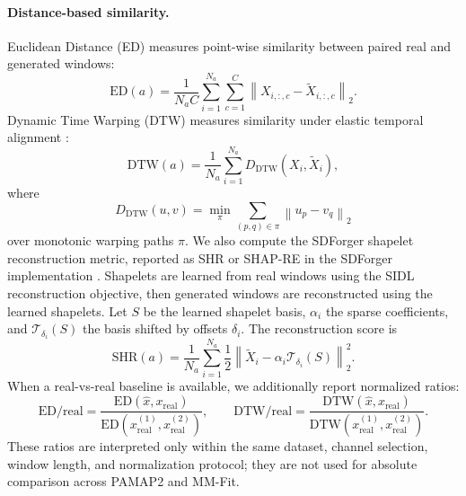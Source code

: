 \paragraph{Distance-based similarity.}
Euclidean Distance (ED) measures point-wise similarity between paired real and
generated windows:
\begin{equation}
    \mathrm{ED}(a)
    =
    \frac{1}{N_a C}
    \sum_{i=1}^{N_a}\sum_{c=1}^{C}
    \left\|
    X_{i,:,c}-\tilde{X}_{i,:,c}
    \right\|_2 .
\end{equation}
Dynamic Time Warping (DTW) measures similarity under elastic temporal alignment
\cite{sakoe1978dtw}:
\begin{equation}
    \mathrm{DTW}(a)
    =
    \frac{1}{N_a}
    \sum_{i=1}^{N_a}
    D_{\mathrm{DTW}}\!\left(X_i,\tilde{X}_i\right),
\end{equation}
where
\begin{equation}
    D_{\mathrm{DTW}}(u,v)
    =
    \min_{\pi}
    \sum_{(p,q)\in\pi}
    \left\|
    u_p-v_q
    \right\|_2
\end{equation}
over monotonic warping paths $\pi$. We also compute the SDForger shapelet
reconstruction metric, reported as SHR or SHAP-RE in the SDForger
implementation \cite{rousseau2025sdforger}. Shapelets are learned from real
windows using the SIDL reconstruction objective, then generated windows are
reconstructed using the learned shapelets. Let $S$ be the learned shapelet basis,
$\alpha_i$ the sparse coefficients, and $\mathcal{T}_{\delta_i}(S)$ the basis
shifted by offsets $\delta_i$. The reconstruction score is
\begin{equation}
    \mathrm{SHR}(a)
    =
    \frac{1}{N_a}
    \sum_{i=1}^{N_a}
    \frac{1}{2}
    \left\|
    \tilde{X}_i
    -
    \alpha_i\mathcal{T}_{\delta_i}(S)
    \right\|_2^2 .
\end{equation}
When a real-vs-real baseline is available, we additionally report normalized
ratios:
\begin{equation}
    \mathrm{ED/real}
    =
    \frac{\mathrm{ED}(\hat{x},x_{\mathrm{real}})}
    {\mathrm{ED}(x_{\mathrm{real}}^{(1)},x_{\mathrm{real}}^{(2)})},
    \qquad
    \mathrm{DTW/real}
    =
    \frac{\mathrm{DTW}(\hat{x},x_{\mathrm{real}})}
    {\mathrm{DTW}(x_{\mathrm{real}}^{(1)},x_{\mathrm{real}}^{(2)})}.
\end{equation}
These ratios are interpreted only within the same dataset, channel selection,
window length, and normalization protocol; they are not used for absolute
comparison across PAMAP2 and MM-Fit.

